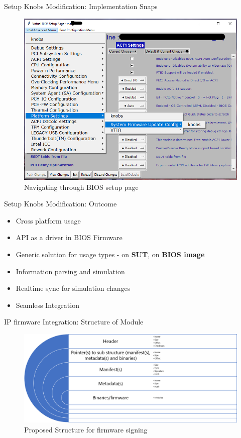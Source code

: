 \begin{frame}[allowframebreaks]{Setup Knobs Modification: Implementation Snaps}
    \begin{figure}[htbp]
        \centering
        \includegraphics[width=0.6\linewidth]{Im/figures/proposed-work/bios-gui-accessing-menu}
        \caption{Navigating through BIOS setup page}\label{fig:proposed-work-bios-gui-accessing-menu}
    \end{figure}
\end{frame}

\begin{frame}{Setup Knobs Modification: Outcome}
    \begin{itemize}
        \item Cross platform usage
        \item API as a driver in BIOS Firmware
        \item Generic solution for usage types - on \textbf{SUT}, on \textbf{BIOS image}
        \item Information parsing and simulation
        \item Realtime sync for simulation changes
        \item Seamless Integration
    \end{itemize}
\end{frame}


\begin{frame}{IP firmware Integration: Structure of Module}
    \begin{figure}[htbp]
        \centering
        \includegraphics[width=\linewidth]{Im/figures/proposed-work/proposed-structure-firmware-signing}
        \caption{Proposed Structure for firmware signing}\label{fig:proposed-work-proposed-structure-firmware-signing}
    \end{figure}
\end{frame}


